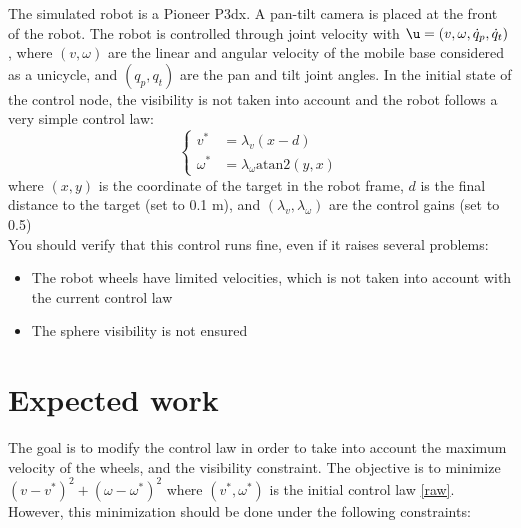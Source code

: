 \documentclass{ecnreport}
\begin{document}
The simulated robot is a Pioneer P3dx. A pan-tilt camera is placed at the front of the robot. The robot is controlled through joint velocity with $\u = (v, \omega, \dot q_p, \dot q_t)$, where $(v,\omega)$ are the linear and angular velocity
of the mobile base considered as a unicycle, and $(q_p, q_t)$ are the pan and tilt joint angles. In the initial state of the control node, the visibility is not taken into account and the robot follows a very simple control law:
\begin{equation}\label{raw}
 \left\{\begin{array}{ll}
         v^* &= \lambda_v(x-d) \\ \omega^* &= \lambda_{\omega}\text{atan2}(y, x)
        \end{array}\right.
\end{equation}where $(x,y)$ is the coordinate of the target in the robot frame, $d$ is the final distance to the target (set to 0.1 m), and $(\lambda_v, \lambda_{\omega})$ are the control gains (set to 0.5)\\

You should verify that this control runs fine, even if it raises several problems:
\begin{itemize}
 \item The robot wheels have limited velocities, which is not taken into account with the current control law
 \item The sphere visibility is not ensured
\end{itemize}


\section{Expected work}

The goal is to modify the control law in order to take into account the maximum velocity of the wheels, and the visibility constraint.
The objective is to minimize $(v-v^*)^2 + (\omega-\omega^*)^2$ where $(v^*,\omega^*)$ is the initial control law \eqref{raw}.
However, this minimization should be done under the following constraints:
\end{document}
